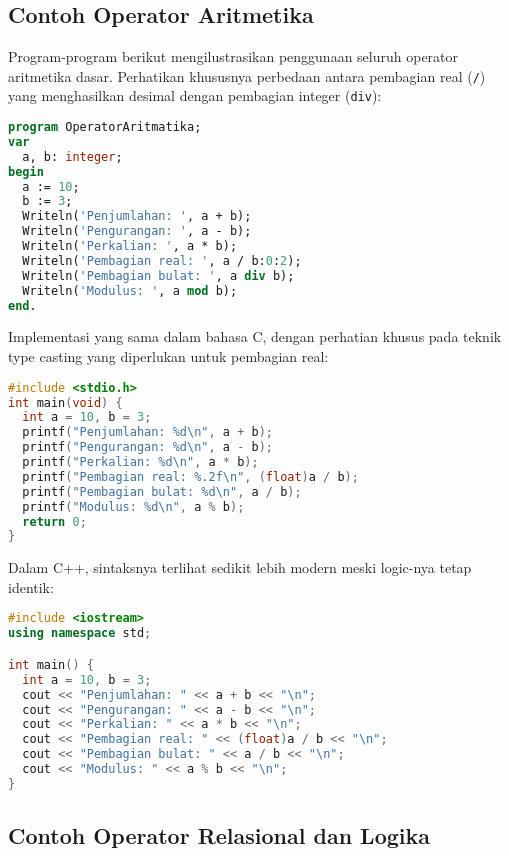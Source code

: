 \documentclass[../main.tex]{subfiles}
\begin{document}
\subsection{Contoh Operator Aritmetika}

Program-program berikut mengilustrasikan penggunaan seluruh operator aritmetika dasar. Perhatikan khususnya perbedaan antara pembagian real (\texttt{/}) yang menghasilkan desimal dengan pembagian integer (\texttt{div}):

\begin{lstlisting}[language=Pascal, caption={Operator aritmetika di Pascal}]
program OperatorAritmatika;
var
  a, b: integer;
begin
  a := 10;
  b := 3;
  Writeln('Penjumlahan: ', a + b);
  Writeln('Pengurangan: ', a - b);
  Writeln('Perkalian: ', a * b);
  Writeln('Pembagian real: ', a / b:0:2);
  Writeln('Pembagian bulat: ', a div b);
  Writeln('Modulus: ', a mod b);
end.
\end{lstlisting}

Implementasi yang sama dalam bahasa C, dengan perhatian khusus pada teknik type casting yang diperlukan untuk pembagian real:

\begin{lstlisting}[language=C, caption={Operator aritmetika di C}]
#include <stdio.h>
int main(void) {
  int a = 10, b = 3;
  printf("Penjumlahan: %d\n", a + b);
  printf("Pengurangan: %d\n", a - b);
  printf("Perkalian: %d\n", a * b);
  printf("Pembagian real: %.2f\n", (float)a / b);
  printf("Pembagian bulat: %d\n", a / b);
  printf("Modulus: %d\n", a % b);
  return 0;
}
\end{lstlisting}

Dalam C++, sintaksnya terlihat sedikit lebih modern meski logic-nya tetap identik:

\begin{lstlisting}[language=C++, caption={Operator aritmetika di C++}]
#include <iostream>
using namespace std;

int main() {
  int a = 10, b = 3;
  cout << "Penjumlahan: " << a + b << "\n";
  cout << "Pengurangan: " << a - b << "\n";
  cout << "Perkalian: " << a * b << "\n";
  cout << "Pembagian real: " << (float)a / b << "\n";
  cout << "Pembagian bulat: " << a / b << "\n";
  cout << "Modulus: " << a % b << "\n";
}
\end{lstlisting}

\subsection{Contoh Operator Relasional dan Logika}
\end{document}
